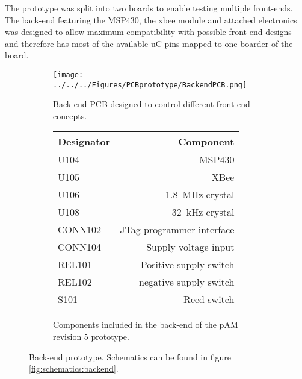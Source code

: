The prototype was split into two boards to enable testing multiple front-ends. The back-end featuring the MSP430, the \acs{xbee} module and attached electronics was designed to allow maximum compatibility with possible front-end designs and therefore has most of the available \ac{uC} pins mapped to one boarder of the board. 
\begin{figure}
	\centering
	\begin{subfigure}{0.6\textwidth}
		\texttt{[image: ../../../Figures/PCBprototype/BackendPCB.png]}
		\caption{Back-end PCB designed to control different front-end concepts.}
	\end{subfigure}
	\begin{subfigure}{0.39\textwidth}
	 \begin{tabular}{lr}
	 	\hline
	 	Designator & Component \\\hline
	 	U104 & MSP430 \\
	 	U105 & XBee \\
	 	U106 & \SI{1.8}{\mega\hertz} crystal\\
	 	U108 & \SI{32}{\kilo\hertz} crystal\\
	 	CONN102 & JTag programmer interface\\
	 	CONN104 & Supply voltage input\\
	 	REL101 & Positive supply switch \\
	 	REL102 & negative supply switch\\
	 	S101 & Reed switch\\\hline 	
	\end{tabular}	%
 	\caption{Components included in the back-end of the \ac{pAM} revision 5 prototype.}
	\end{subfigure}
	\caption{Back-end prototype. Schematics can be found in figure \ref{fig:schematics:backend}.}
	\label{fig:pcb:backend}
\end{figure}
